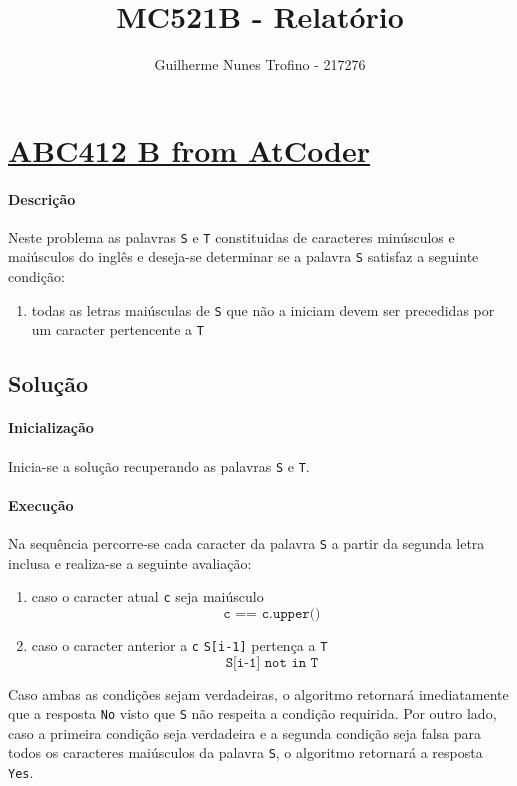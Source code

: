 \documentclass[a4paper]{article}
\author{Guilherme Nunes Trofino - 217276}
\title{MC521B - Relatório }
\begin{document}
\maketitle
\section{\href{https://atcoder.jp/contests/abc412/tasks/abc412_b?lang=en}{ABC412 B from AtCoder}}
\paragraph{Descrição}Neste problema as palavras \texttt{S} e \texttt{T} constituidas de caracteres minúsculos e maiúsculos do inglês e deseja-se determinar se a palavra \texttt{S} satisfaz a seguinte condição:
\begin{enumerate}
    \item todas as letras maiúsculas de \texttt{S} que não a iniciam devem ser precedidas por um caracter pertencente a \texttt{T}
\end{enumerate}

\subsection{Solução}

\paragraph{Inicialização}Inicia-se a solução recuperando as palavras \texttt{S} e \texttt{T}.

\paragraph{Execução}Na sequência percorre-se cada caracter da palavra \texttt{S} a partir da segunda letra inclusa e realiza-se a seguinte avaliação:
\begin{enumerate}
    \item caso o caracter atual \texttt{c} seja maiúsculo
    \begin{equation}
        \texttt{c == c.upper()}
    \end{equation}
    \item caso o caracter anterior a \texttt{c} \texttt{S[i-1]} pertença a \texttt{T}
    \begin{equation}
        \texttt{S[i-1] not in T}
    \end{equation}
\end{enumerate}
Caso ambas as condições sejam verdadeiras, o algoritmo retornará imediatamente que a resposta \texttt{No} visto que \texttt{S} não respeita a condição requirida. Por outro lado, caso a primeira condição seja verdadeira e a segunda condição seja falsa para todos os caracteres maiúsculos da palavra \texttt{S}, o algoritmo retornará a resposta \texttt{Yes}.
\end{document}
